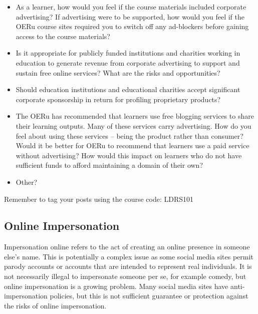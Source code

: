 \documentclass[
]{book}
\providecommand{\tightlist}{%
  \setlength{\itemsep}{0pt}\setlength{\parskip}{0pt}}
\theoremstyle{definition}
\theoremstyle{definition}
\theoremstyle{definition}
\theoremstyle{definition}
\theoremstyle{remark}
\begin{document}
\begin{reflect}
\begin{itemize}
\tightlist
\item
  As a learner, how would you feel if the course materials included corporate advertising? If advertising were to be supported, how would you feel if the OERu course sites required you to switch off any ad-blockers before gaining access to the course materials?\\
\item
  Is it appropriate for publicly funded institutions and charities working in education to generate revenue from corporate advertising to support and sustain free online services? What are the risks and opportunities?\\
\item
  Should education institutions and educational charities accept significant corporate sponsorship in return for profiling proprietary products?\\
\item
  The OERu has recommended that learners use free blogging services to share their learning outputs. Many of these services carry advertising. How do you feel about using these services -- being the product rather than consumer? Would it be better for OERu to recommend that learners use a paid service without advertising? How would this impact on learners who do not have sufficient funds to afford maintaining a domain of their own?\\
\item
  Other?
\end{itemize}

Remember to tag your posts using the course code: LDRS101
\end{reflect}

\hypertarget{online-impersonation}{%
\subsection{Online Impersonation}\label{online-impersonation}}

Impersonation online refers to the act of creating an online presence in someone else's name. This is potentially a complex issue as some social media sites permit parody accounts or accounts that are intended to represent real individuals. It is not necessarily illegal to impersonate someone per se, for example comedy, but online impersonation is a growing problem. Many social media sites have anti-impersonation policies, but this is not sufficient guarantee or protection against the risks of online impersonation.
\end{document}
